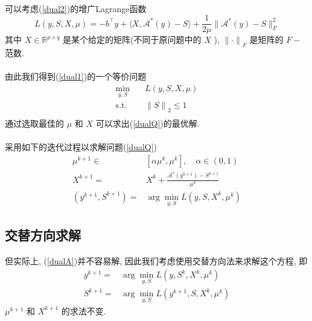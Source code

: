 \documentclass[UTF8]{ctexart}
\numberwithin{equation}{section}
\begin{document}
			\paragraph{}
				\quad 可以考虑(\ref{dual2})的增广Lagrange函数
				\begin{equation}\label{Lag}
						L(y, S, X, \mu)
					=	-b^\top y + \langle{X, \mathcal{A}^*(y) - S}\rangle + \frac{1}{2\mu} \lVert{\mathcal{A}^*(y) - S}\rVert^2_F
				\end{equation}
				其中 $X \in \mathbb{R}^{p \times q}$ 是某个给定的矩阵(不同于原问题中的 $X$ ), ${\lVert{\cdot}\rVert}_F$ 是矩阵的 $F-$范数.

			\paragraph{}
				\quad 由此我们得到(\ref{dual1})的一个等价问题
				\begin{equation}
					\begin{split}\label{dualQ}
						\min_{y,S} \quad
							& L(y, S, X, \mu)\\
						\text{s.t.} \quad
							& {\lVert{S}\rVert}_2 \le 1\\
					\end{split}
				\end{equation}
				通过选取最佳的 $\mu$ 和 $X$ 可以求出(\ref{dualQ})的最优解.
		
		
			\paragraph{}
				\quad 采用如下的迭代过程以求解问题(\ref{dualQ})
				\begin{equation}
					\begin{split}\label{dualA}
							\mu^{k + 1}
						\in	& [\alpha \mu^k, \mu^k], \quad \alpha \in (0,1)\\
							X^{k + 1}
						=	& X^k + \frac{\mathcal{A}^*(y^{k + 1}) - S^{k + 1}}{\mu^k}\\
							(y^{k + 1}, S^{k + 1}) 
						=	& \arg \min_{y, S}L(y, S, X^k, \mu^k)
					\end{split}
				\end{equation}
		\subsection{交替方向求解}
			\paragraph{}
				\quad 但实际上, (\ref{dualA})并不容易解, 因此我们考虑使用交替方向法来求解这个方程, 即
				\begin{align}
						y^{k + 1}
					=	& \arg \min_{y, S}L(y, S^k, X^k, \mu^k) \label{FixS}\\
						S^{k + 1}
					=	& \arg \min_{y, S}L(y^{k + 1}, S, X^k, \mu^k) \label{FixY}
				\end{align}
				$\mu^{k + 1}$ 和 $X^{k + 1}$ 的求法不变.
\end{document}
